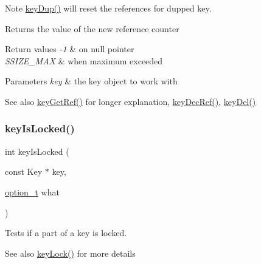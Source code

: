 \begin{DoxyNote}{Note}
\mbox{\hyperlink{group__key_gae6ec6a60cc4b8c1463fa08623d056ce3}{key\+Dup()}} will reset the references for dupped key.
\end{DoxyNote}
\begin{DoxyReturn}{Returns}
the value of the new reference counter 
\end{DoxyReturn}

\begin{DoxyRetVals}{Return values}
{\em -\/1} & on null pointer \\
\hline
{\em S\+S\+I\+Z\+E\+\_\+\+M\+AX} & when maximum exceeded \\
\hline
\end{DoxyRetVals}

\begin{DoxyParams}{Parameters}
{\em key} & the key object to work with \\
\hline
\end{DoxyParams}
\begin{DoxySeeAlso}{See also}
\mbox{\hyperlink{group__key_ga4aabc4272506dd63161db2bbb42de8ae}{key\+Get\+Ref()}} for longer explanation, \mbox{\hyperlink{group__key_ga2c6433ca22109e4e141946057eccb283}{key\+Dec\+Ref()}}, \mbox{\hyperlink{group__key_ga3df95bbc2494e3e6703ece5639be5bb1}{key\+Del()}} 
\end{DoxySeeAlso}
\mbox{\label{group__key_gae5d229b4843e3ad76c139bd887d81a35}} 
\subsubsection{\texorpdfstring{keyIsLocked()}{keyIsLocked()}}
{\footnotesize\ttfamily int key\+Is\+Locked (\begin{DoxyParamCaption}\item[{const Key $\ast$}]{key,  }\item[{\mbox{\hyperlink{group__keyset_ga98a3d6a4016c9dad9cbd1a99a9c2a45a}{option\+\_\+t}}}]{what }\end{DoxyParamCaption})}



Tests if a part of a key is locked. 

\begin{DoxySeeAlso}{See also}
\mbox{\hyperlink{group__key_ga2dd8d2650e59a90e933c631267bfbb85}{key\+Lock()}} for more details 
\end{DoxySeeAlso}

